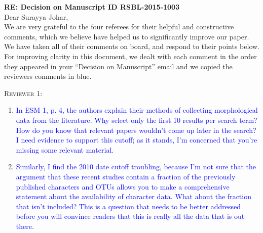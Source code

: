\documentclass[12pt,letterpaper]{article}
\renewcommand{\section}[1]{%
\bigskip
\begin{center}
\begin{Large}
\normalfont\scshape #1
\medskip
\end{Large}
\end{center}}
\begin{document}
\textbf{RE: Decision on Manuscript ID RSBL-2015-1003}\\
\bigskip
Dear Surayya Johar,\\
\bigskip
We are very grateful to the four referees for their helpful and constructive comments, which we believe have helped us to significantly improve our paper. We have taken all of their comments on board, and respond to their points below. For improving clarity in this document, we dealt with each comment in the order they appeared in your ``Decision on Manuscript'' email and we copied the reviewers comments in blue.


\section{Reviewer 1:}
\begin{enumerate}
\item{\textcolor{blue}{In ESM 1, p. 4, the authors explain their methods of collecting morphological data from the literature. Why select only the first 10 results per search term? How do you know that relevant papers wouldn’t come up later in the search? I need evidence to support this cutoff; as it stands, I’m concerned that you’re missing some relevant material.}}

\item{\textcolor{blue}{Similarly, I find the 2010 date cutoff troubling, because I’m not sure that the argument that these recent studies contain a fraction of the previously published characters and OTUs allows you to make a comprehensive statement about the availability of character data. What about the fraction that isn’t included? This is a question that needs to be better addressed before you will convince readers that this is really all the data that is out there.}}
\end{enumerate}
\end{document}
